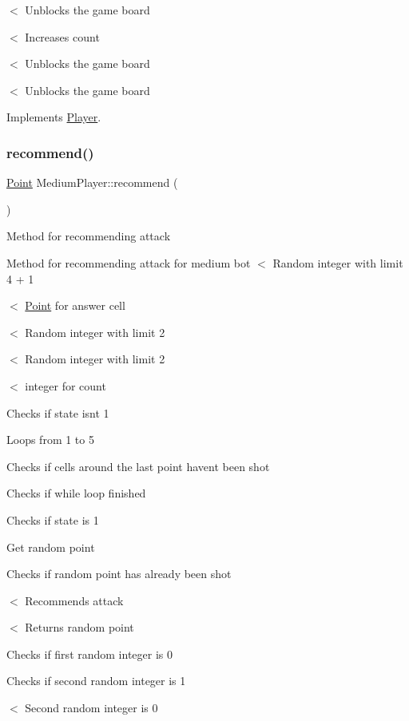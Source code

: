 $<$ Unblocks the game board

$<$ Increases count

$<$ Unblocks the game board

$<$ Unblocks the game board 

Implements \mbox{\hyperlink{class_player_ab89c1180c7314d3e19bcf4b2bed2e02a}{Player}}.

\mbox{\label{class_medium_player_a2e99d57f30f3f7f929840b8cda16527d}} 
\subsubsection{\texorpdfstring{recommend()}{recommend()}}
{\footnotesize\ttfamily \mbox{\hyperlink{class_point}{Point}} Medium\+Player\+::recommend (\begin{DoxyParamCaption}{ }\end{DoxyParamCaption})\hspace{0.3cm}{\ttfamily [virtual]}}

Method for recommending attack

Method for recommending attack for medium bot $<$ Random integer with limit 4 + 1

$<$ \mbox{\hyperlink{class_point}{Point}} for answer cell

$<$ Random integer with limit 2

$<$ Random integer with limit 2

$<$ integer for count

Checks if state isn\textquotesingle{}t 1

Loops from 1 to 5

Checks if cells around the last point haven\textquotesingle{}t been shot

Checks if while loop finished

Checks if state is 1

Get random point

Checks if random point has already been shot

$<$ Recommends attack

$<$ Returns random point

Checks if first random integer is 0

Checks if second random integer is 1

$<$ Second random integer is 0


